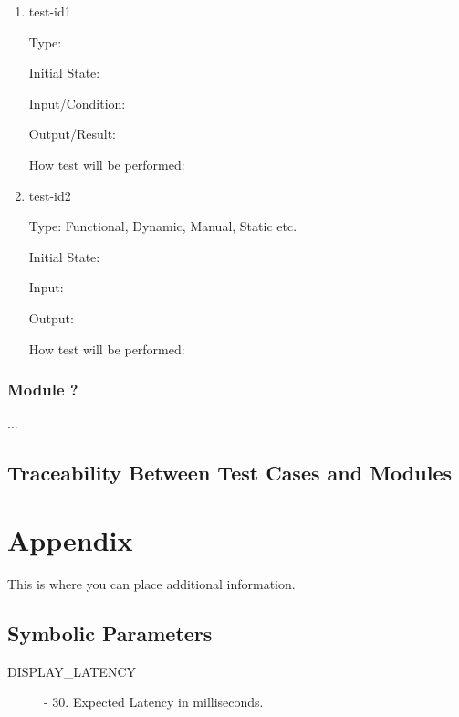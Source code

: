 \documentclass[12pt, titlepage]{article}
\begin{document}
\begin{enumerate}

\item{test-id1\\}

Type: 

Initial State:

Input/Condition:

Output/Result:

How test will be performed:

\item{test-id2\\}

Type: Functional, Dynamic, Manual, Static etc.

Initial State:

Input:

Output:

How test will be performed:

\end{enumerate}

\subsubsection{Module ?}

...

\subsection{Traceability Between Test Cases and Modules}






\newpage

\section{Appendix}

This is where you can place additional information.

\subsection{Symbolic Parameters}

\begin{description}
  \item[DISPLAY\_LATENCY] - 30. Expected Latency in milliseconds. 
\end{description}
\end{document}
